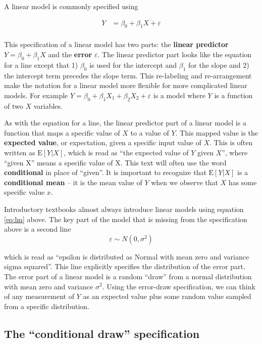 \documentclass[]{book}
\begin{document}
A linear model is commonly specified using

\begin{align}
Y &= \beta_0 + \beta_1 X + \varepsilon\\
\label{eq:lm}
\end{align}

This specification of a linear model has two parts: the \textbf{linear predictor} \(Y = \beta_0 + \beta_1 X\) and the \textbf{error} \(\varepsilon\). The linear predictor part looks like the equation for a line except that 1) \(\beta_0\) is used for the intercept and \(\beta_1\) for the slope and 2) the intercept term precedes the slope term. This re-labeling and re-arrangement make the notation for a linear model more flexible for more complicated linear models. For example \(Y = \beta_0 + \beta_1 X_1 + \beta_2 X_2 + \varepsilon\) is a model where \(Y\) is a function of two \(X\) variables.

As with the equation for a line, the linear predictor part of a linear model is a function that maps a specific value of \(X\) to a value of \(Y\). This mapped value is the \textbf{expected value}, or expectation, given a specific input value of \(X\). This is often written as \(\mathrm{E}[Y|X]\), which is read as ``the expected value of \(Y\) given \(X\)'', where ``given X'' means a specific value of X. This text will often use the word \textbf{conditional} in place of ``given''. It is important to recognize that \(\mathrm{E}[Y|X]\) is a \textbf{conditional mean} -- it is the mean value of \(Y\) when we observe that \(X\) has some specific value \(x\).

Introductory textbooks almost always introduce linear models using equation \eqref{eq:lm} above. The key part of the model that is missing from the specification above is a second line
\begin{equation}
\varepsilon \sim N(0, \sigma^2)
\end{equation}

which is read as ``epsilon is distributed as Normal with mean zero and variance sigma squared''. This line explicitly specifies the distribution of the error part. The error part of a linear model is a random ``draw'' from a normal distribution with mean zero and variance \(\sigma^2\). Using the error-draw specification, we can think of any measurement of \(Y\) as an expected value plus some random value sampled from a specific distribution.

\hypertarget{the-conditional-draw-specification}{%
\subsection{The ``conditional draw'' specification}\label{the-conditional-draw-specification}}
\end{document}
